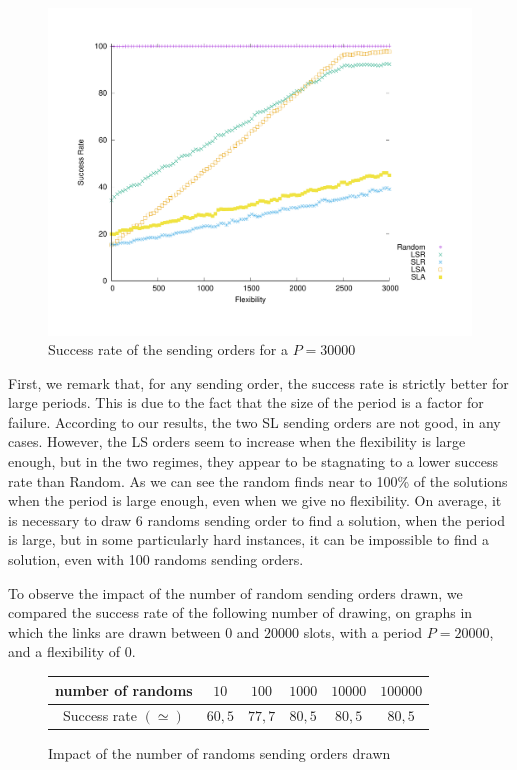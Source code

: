 \documentclass[a4paper,10pt]{article}
\begin{document}
     
       
\begin{figure}

       \begin{center}
      \includegraphics[scale=0.4]{departs_gp_30000.pdf}
      \end{center}
      \caption{Success rate of the sending orders for a $P = 30000$}
     \end{figure}
     
     First, we remark that, for any sending order, the success rate is strictly better for large periods. This is due to the fact that the size of the period is a factor for failure. According to our results, the two SL sending orders are not good, in any cases. However, the LS orders seem to increase when the flexibility is large enough, but in the two regimes, they appear to be stagnating to a lower success rate than Random. As we can see the random finds near to 100\% of the solutions when the period is large enough, even when we give no flexibility. On average, it is necessary to draw 6 randoms sending order to find a solution, when the period is large, but in some particularly hard instances, it can be impossible to find a solution, even with 100 randoms sending orders. 
     
     To observe  the impact of the number of random sending orders drawn, we compared the success rate of the following number of drawing, on graphs in which the links are drawn  between $0$ and $20000$ slots, with a period $P=20000$, and a flexibility of $0$.
       \begin{figure}

       \begin{center}
   \begin{tabular}{|c|c|c|c|c|c|}
    \hline
    number of randoms & $10$ & $100$& $1 000$& $10 000$&$100 000$\\
    \hline
    Success rate $(\simeq)$ & $60,5$&$77,7$&$80,5$&$80,5$&$80,5$\\
    \hline
      \end{tabular}
      \end{center}
   \caption{Impact of the number of randoms sending orders drawn}
     \end{figure}
     
\end{document}
